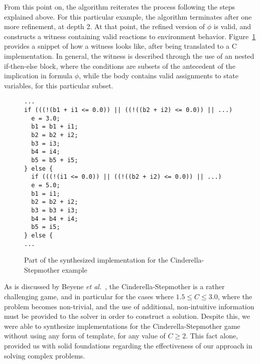 From this point on, the algorithm reiterates the process following the steps
explained above. For this particular example, the algorithm terminates after one
more refinement, at depth 2. At that point, the refined version of
$\phi$ is valid, and \aeval constructs a witness containing valid reactions to
environment behavior. Figure~\ref{fg:witness} provides a snippet of how a
witness looks like, after being translated to a C implementation. In general,
the witness is described through the use of an nested if-then-else block, where the conditions are subsets of the antecedent of
the implication in formula $\phi$, while the body contains valid assignments to
state variables, for this particular subset.


\begin{figure}[!t]
\centering
 \begin{Verbatim}[fontsize=\scriptsize]
...
if (((!(b1 + i1 <= 0.0)) || ((!((b2 + i2) <= 0.0)) || ...)
  e = 3.0;
  b1 = b1 + i1;
  b2 = b2 + i2;
  b3 = i3;
  b4 = i4;
  b5 = b5 + i5;
} else {
  if (((!(i1 <= 0.0)) || ((!((b2 + i2) <= 0.0)) || ...)
  e = 5.0;
  b1 = i1;
  b2 = b2 + i2;
  b3 = b3 + i3;
  b4 = b4 + i4;
  b5 = i5;
} else {
...
 \end{Verbatim}
\caption{Part of the synthesized implementation for the Cinderella-Stepmother
example}
\label{fg:witness}
\end{figure}

As is discussed by Beyene \textit{et al.}~\cite{beyene2014constraint}, the
Cinderella-Stepmother is a rather challenging game, and in particular for the
cases where $1.5 \leq C \leq 3.0$, where the problem becomes non-trivial, and
the use of additional, non-intuitive information must be provided to the solver
in order to construct a solution. Despite this, we were able to synthesize
implementations for the Cinderella-Stepmother game without using any form of
template, for any value of $C \geq 2$. This fact alone, provided us with
solid foundations regarding the effectiveness of our approach in solving
complex problems.
         